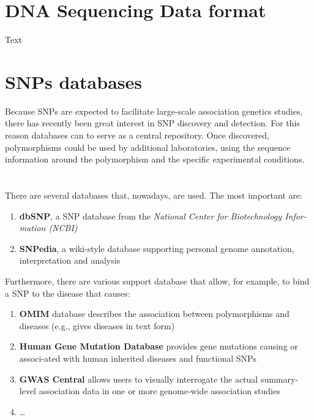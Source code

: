 \section{DNA Sequencing Data format}

Text



\section{SNPs databases}

Because SNPs are expected to facilitate large-scale association genetics studies, there has recently been great interest in SNP discovery and detection. For this reason databases can to serve as a central repository. Once discovered, polymorphisms could be used by additional laboratories, using the sequence information around the polymorphism and the specific experimental conditions.
\\
\\
\\There are several databases that, nowadays, are used. The most important are:

\begin{enumerate}
	\item \textbf{dbSNP}, a SNP database from the \emph{National Center for Biotechnology Infor-mation (NCBI)}
	\item \textbf{SNPedia}, a wiki-style database supporting personal genome annotation, interpretation and analysis
	\end{enumerate}

Furthermore, there are various support database that allow, for example, to bind a SNP to the disease that causes:

\begin{enumerate}
	\item \textbf{OMIM} database describes the association between polymorphisms and diseases (e.g., gives diseases in text form)
	\item \textbf{Human Gene Mutation Database} provides gene mutations causing or associ-ated with human inherited diseases and functional SNPs
	\item \textbf{GWAS Central} allows users to visually interrogate the actual summary-level association data in one or more genome-wide association studies
	\item \ldots
	\end{enumerate}